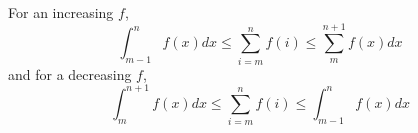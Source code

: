\documentclass[11pt]{article}
\begin{document}
	For an increasing $f$,
	\begin{equation}
		\int_{m-1}^n f(x)dx \leq \sum_{i=m}^n f(i) \leq \sum_m^{n+1} f(x)dx
	\end{equation}
	and for a decreasing $f$,
	\begin{equation}
		\int_{m}^{n+1} f(x)dx \leq \sum_{i=m}^{n} f(i) \leq \int_{m-1}^n f(x)dx
	\end{equation}

	
%		
%		


\end{document}
